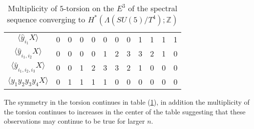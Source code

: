 \documentclass{article}
\theoremstyle{plain}
\theoremstyle{definition}
\numberwithin{thm}{section}
\begin{document}
			\begin{table}[ht]
			\centering
			\caption{Multiplicity of $5$-torsion on the $E^3$ of the spectral sequence converging to $H^*(\Lambda(SU(5)/T^4);\mathbb{Z})$}
			\label{n=4}
			\begin{tabular}{c|lllllllllll}
			
			$\langle \hat{y}_{i_1}X \rangle$				 & 0 & 0 & 0 & 0 & 0 & 0 & 0 & 1 & 1 & 1 & 1 \\
			$\langle \hat{y}_{i_1,i_2}X \rangle$		 & 0 & 0 & 0 & 0 & 1 & 2 & 3 & 3 & 2 & 1 & 0 \\
			$\langle \hat{y}_{i_1,i_2,i_3}X \rangle$ & 0 & 0 & 1 & 2 & 3 & 3 & 2 & 1 & 0 & 0 & 0 \\
			$\langle y_1y_2y_3y_4X \rangle$					 & 0 & 1 & 1 & 1 & 1 & 0 & 0 & 0 & 0 & 0 & 0 
			\end{tabular}
			\end{table}

			The symmetry in the torsion continues in table (\ref{n=4}), in addition the multiplicity of the torsion continues to increases in the center of the table 
			suggesting that these observations may continue to be true for larger $n$.

\newpage


\end{document}
